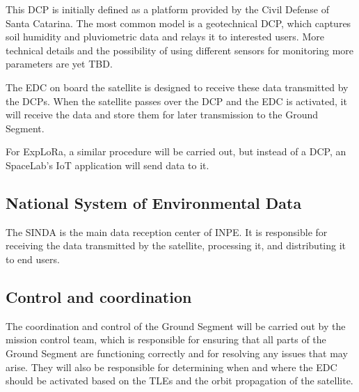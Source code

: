 This \ac{DCP} is initially defined as a platform provided by the Civil Defense of Santa Catarina. The most common model is a geotechnical \ac{DCP}, which captures soil humidity and pluviometric data and relays it to interested users. More technical details and the possibility of using different sensors for monitoring more parameters are yet \ac{TBD}.

The \ac{EDC} on board the satellite is designed to receive these data transmitted by the \acp{DCP}. When the satellite passes over the \ac{DCP} and the \ac{EDC} is activated, it will receive the data and store them for later transmission to the Ground Segment.

For ExpLoRa, a similar procedure will be carried out, but instead of a \ac{DCP}, an SpaceLab's \ac{IoT} application will send data to it.

\subsection{National System of Environmental Data}

The \ac{SINDA} is the main data reception center of \ac{INPE}. It is responsible for receiving the data transmitted by the satellite, processing it, and distributing it to end users. %



\subsection{Control and coordination}

The coordination and control of the Ground Segment will be carried out by the mission control team, which is responsible for ensuring that all parts of the Ground Segment are functioning correctly and for resolving any issues that may arise. They will also be responsible for determining when and where the \ac{EDC} should be activated based on the \acp{TLE} and the orbit propagation of the satellite.

